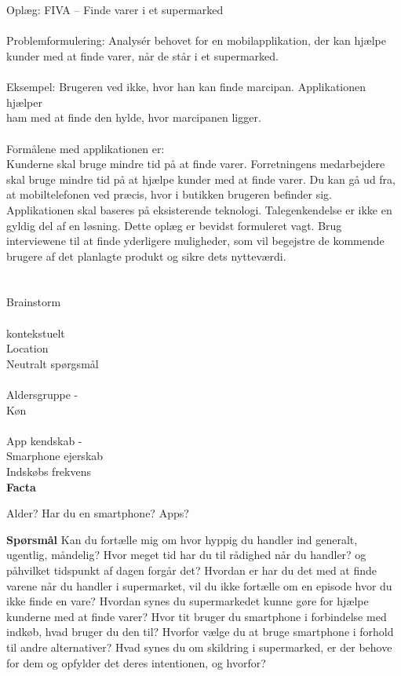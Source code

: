 \documentclass[12pt]{article}
\begin{document}
\section*{}
Oplæg: FIVA – Finde varer i et supermarked\\
\\
Problemformulering: Analysér behovet for en mobilapplikation, der kan hjælpe kunder med at finde varer, når de står i et
supermarked.\\
\\
Eksempel: Brugeren ved ikke, hvor han kan finde marcipan. Applikationen hjælper\\
ham med at finde den hylde, hvor marcipanen ligger.\\
\\
Formålene med applikationen er:\\
Kunderne skal bruge mindre tid på at finde varer.
Forretningens medarbejdere skal bruge mindre tid på at hjælpe kunder med at finde varer. Du kan gå ud fra, at mobiltelefonen ved præcis, hvor i butikken brugeren befinder sig. Applikationen skal baseres på eksisterende teknologi. Talegenkendelse er ikke en gyldig del af en løsning. Dette oplæg er bevidst formuleret vagt. Brug interviewene til at finde yderligere muligheder, som vil begejstre de kommende brugere af det planlagte produkt og sikre dets nytteværdi.

\section*{}

Brainstorm\\
\\
kontekstuelt\\
Location\\
Neutralt sp\o rgsm\aa l\\
\\
Aldersgruppe - \\ 
K\o n\\
\\
App kendskab - \\
Smarphone ejerskab\\
Indsk\o bs frekvens\\

\textbf{Facta}

Alder? 
Har du en smartphone?
Apps?


\textbf{Sp\o rsm\aa l}
Kan du fort\ae lle mig om hvor hyppig du handler ind generalt, ugentlig, m\aa ndelig? 
Hvor meget tid har du til r\aa dighed n\aa r du handler? og p\aa hvilket tidspunkt af dagen forg\aa r det?
Hvordan er har du det med at finde varene n\aa r du handler i supermarket, vil du ikke fort\ae lle om
en episode hvor du ikke finde en vare?
Hvordan synes du supermarkedet kunne g\o re for hj\ae lpe kunderne med at finde varer?
Hvor tit bruger du smartphone i forbindelse med indk\o b, hvad bruger du den til?
Hvorfor v\ae lge du at bruge smartphone i forhold til andre alternativer? 
Hvad synes du om skildring i supermarked, er der behove for dem og opfylder det deres intentionen, og hvorfor?
\end{document}
